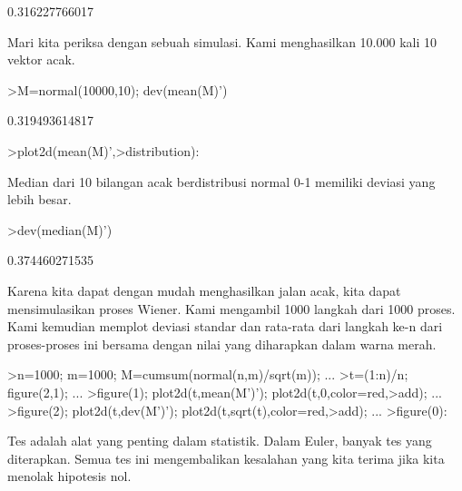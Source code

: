 \documentclass[12pt,arial,letterpaper]{book}
\begin{document}
\begin{eulernootebook}
\begin{eulercomment}
\begin{eulercomment}
\begin{eulernootebook}
\begin{eulercomment}
\begin{eulercomment}
\begin{eulercomment}
\begin{eulercomment}
\begin{eulercomment}
\begin{eulercomment}
\begin{eulercomment}
\begin{eulerprompt}
\end{eulerprompt}
\begin{euleroutput}
  0.316227766017
\end{euleroutput}
\begin{eulercomment}
Mari kita periksa dengan sebuah simulasi. Kami menghasilkan 10.000
kali 10 vektor acak.
\end{eulercomment}
\begin{eulerprompt}
>M=normal(10000,10); dev(mean(M)')
\end{eulerprompt}
\begin{euleroutput}
  0.319493614817
\end{euleroutput}
\begin{eulerprompt}
>plot2d(mean(M)',>distribution):
\end{eulerprompt}
\begin{eulercomment}
Median dari 10 bilangan acak berdistribusi normal 0-1 memiliki deviasi
yang lebih besar.
\end{eulercomment}
\begin{eulerprompt}
>dev(median(M)')
\end{eulerprompt}
\begin{euleroutput}
  0.374460271535
\end{euleroutput}
\begin{eulercomment}
Karena kita dapat dengan mudah menghasilkan jalan acak, kita dapat
mensimulasikan proses Wiener. Kami mengambil 1000 langkah dari 1000
proses. Kami kemudian memplot deviasi standar dan rata-rata dari
langkah ke-n dari proses-proses ini bersama dengan nilai yang
diharapkan dalam warna merah.
\end{eulercomment}
\begin{eulerprompt}
>n=1000; m=1000; M=cumsum(normal(n,m)/sqrt(m)); ...
>t=(1:n)/n; figure(2,1); ...
>figure(1); plot2d(t,mean(M')'); plot2d(t,0,color=red,>add); ...
>figure(2); plot2d(t,dev(M')'); plot2d(t,sqrt(t),color=red,>add); ...
>figure(0):
\end{eulerprompt}
\begin{eulercomment}
Tes adalah alat yang penting dalam statistik. Dalam Euler, banyak tes
yang diterapkan. Semua tes ini mengembalikan kesalahan yang kita
terima jika kita menolak hipotesis nol.


\end{eulercomment}
\end{eulercomment}
\end{eulercomment}
\end{eulercomment}
\end{eulercomment}
\end{eulercomment}
\end{eulercomment}
\end{eulercomment}
\end{eulernootebook}
\end{eulercomment}
\end{eulercomment}
\end{eulernootebook}
\end{document}
